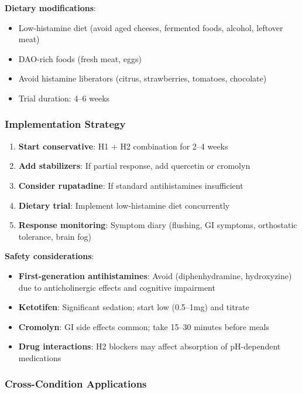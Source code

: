 \textbf{Dietary modifications}:
\begin{itemize}
    \item Low-histamine diet (avoid aged cheeses, fermented foods, alcohol, leftover meat)
    \item DAO-rich foods (fresh meat, eggs)
    \item Avoid histamine liberators (citrus, strawberries, tomatoes, chocolate)
    \item Trial duration: 4--6 weeks
\end{itemize}

\subsubsection{Implementation Strategy}

\begin{enumerate}
    \item \textbf{Start conservative}: H1 + H2 combination for 2--4 weeks
    \item \textbf{Add stabilizers}: If partial response, add quercetin or cromolyn
    \item \textbf{Consider rupatadine}: If standard antihistamines insufficient
    \item \textbf{Dietary trial}: Implement low-histamine diet concurrently
    \item \textbf{Response monitoring}: Symptom diary (flushing, GI symptoms, orthostatic tolerance, brain fog)
\end{enumerate}

\textbf{Safety considerations}:
\begin{itemize}
    \item \textbf{First-generation antihistamines}: Avoid (diphenhydramine, hydroxyzine) due to anticholinergic effects and cognitive impairment
    \item \textbf{Ketotifen}: Significant sedation; start low (0.5--1mg) and titrate
    \item \textbf{Cromolyn}: GI side effects common; take 15--30 minutes before meals
    \item \textbf{Drug interactions}: H2 blockers may affect absorption of pH-dependent medications
\end{itemize}

\subsubsection{Cross-Condition Applications}


